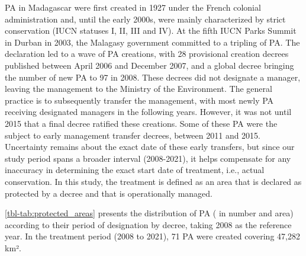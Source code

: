 \documentclass[
]{article}
\begin{document}
PA in Madagascar were first created in 1927 under the French colonial
administration and, until the early 2000s, were mainly characterized by
strict conservation (IUCN statuses I, II, III and IV). At the fifth IUCN
Parks Summit in Durban in 2003, the Malagasy government committed to a
tripling of PA. The declaration led to a wave of PA creations, with 28
provisional creation decrees published between April 2006 and December
2007, and a global decree bringing the number of new PA to 97 in 2008.
These decrees did not designate a manager, leaving the management to the
Ministry of the Environment. The general practice is to subsequently
transfer the management, with most newly PA receiving designated
managers in the following years. However, it was not until 2015 that a
final decree ratified these creations. Some of these PA were the subject
to early management transfer decrees, between 2011 and 2015. Uncertainty
remains about the exact date of these early transfers, but since our
study period spans a broader interval (2008-2021), it helps compensate
for any inaccuracy in determining the exact start date of treatment,
i.e., actual conservation. In this study, the treatment is defined as an
area that is declared as protected by a decree and that is operationally
managed.

\autoref{tbl-tab:protected_areas} presents the distribution of PA ( in
number and area) according to their period of designation by decree,
taking 2008 as the reference year. In the treatment period (2008 to
2021), 71 PA were created covering 47,282 km².

\setcounter{table}{0}

\noindent 
\end{document}
